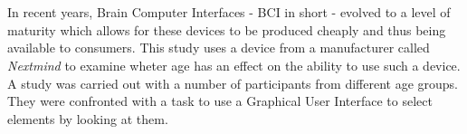 



\usepackage[utf8]{inputenc} %





\newcommand{\vorname}{Julius}
\newcommand{\nachname}{Neudecker}
\newcommand{\matrikelnummer}{2025850}

\newcommand{\titel}{{[Working Title] Using a neural interface for interaction in virtual reality}\\[0.2ex] 
				\Large an HCI study}

\newcommand{\erstpruef}{Prof. Dr.Roland Greule}
\newcommand{\zweitpruef}{Dipl. Inf. Rüdiger Höfert}

\date{preliminary version from \today}   %



    \maketitle
    \tableofcontents
    \clearpage          %


    \thispagestyle{empty}
    \section*{\centering\abstractname}
    In recent years, Brain Computer Interfaces - BCI in short - evolved to a level of maturity which allows for these devices to be produced cheaply and thus being available to consumers. This study uses a device from a manufacturer called \textit{Nextmind} to examine wheter age has an effect on the ability to use such a device. A study was carried out with a number of  participants from different age groups. They were confronted with a task to use a Graphical User Interface to select elements by looking at them. 

